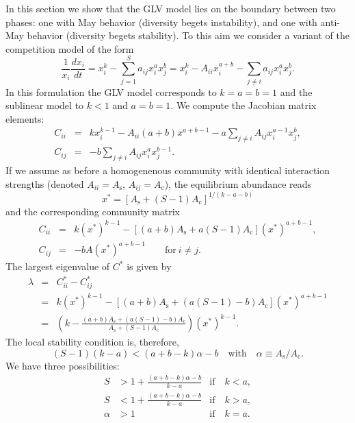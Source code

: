 \documentclass[12pt]{article}
\begin{document}
In this section we show that the GLV model lies on the boundary between two phases: one with May behavior (diversity begets instability), and one with anti-May behavior (diversity begets stability). To this aim we consider a variant of the competition model of the form
\begin{equation}
    \frac{1}{x_i}\frac{dx_i}{dt} = x_i^k - \sum_{j = 1}^Sa_{ij}x_i^a x_j^b = x_i^k - A_{ii} x_i^{a+b}- \sum_{j \neq i}a_{ij}x_i^a x_j^b.
\end{equation}
In this formulation the GLV model corresponds to $k = a = b = 1$ and the sublinear model to $k < 1$ and $a = b = 1$. We compute the Jacobian matrix elements:
\begin{eqnarray}
    C_{ii} &=& kx_i^{k-1} - A_{ii} (a+b) x^{a+b-1} - a\sum_{j \neq i}A_{ij}x_i^{a-1} x_j^b, \\  
    C_{ij} &=& -b\sum_{j \neq i}A_{ij}x_i^{a} x_j^{b-1}.
\end{eqnarray}
If we assume as before a homogenenous community with identical interaction strengths (denoted $A_{ii} = A_{\textrm{s}}$, $A_{ij} = A_{\textrm{c}}$), the equilibrium abundance reads
\begin{equation}
    x^* = [A_{\textrm{s}} + (S-1)A_{\textrm{c}}]^{1/(k-a-b)} 
\end{equation}
and the corresponding community matrix
\begin{eqnarray}
    C_{ii} &=& k(x^*)^{k-1} - [(a+b) A_{\textrm{s}} + a(S-1)A_{\textrm{c}}](x^*)^{a+b-1}, \nonumber \\  
    C_{ij} &=& -bA(x^*)^{a+b-1} \quad\quad \textrm{for}\ i \neq j.\nonumber
\end{eqnarray}
The largest eigenvalue of $C^*$ is given by
\begin{eqnarray}
    \lambda &=& C^*_{ii} - C^*_{ij}\nonumber\\
     &=& k(x^*)^{k-1} - [(a+b)A_{\textrm{s}} +(a(S-1)-b)A_{\textrm{c}}](x^*)^{a+b-1}\nonumber\\
    & = & \left(k - \frac{(a+b)A_{\textrm{s}} +(a(S-1)-b)A_{\textrm{c}}}{A_{\textrm{s}} + (S-1)A_{\textrm{c}}}\right)(x^*)^{k-1}.\nonumber
\end{eqnarray}
The local stability condition is, therefore, 
\begin{equation}
    (S-1)(k-a) < (a+b - k)\alpha - b \quad \textrm{with}\quad \alpha \equiv A_{\textrm{s}}/A_{\textrm{c}}. 
\end{equation}
We have three possibilities:
\begin{align}
    S &> 1 + \frac{(a+b - k)\alpha - b}{k-a} &\textrm{if}\quad k < a,\nonumber\\
    S &< 1 + \frac{(a+b - k)\alpha - b}{k-a} &\textrm{if}\quad k > a,\nonumber\\
    \alpha &> 1 &\textrm{if}\quad k = a.\nonumber
\end{align}
\end{document}
